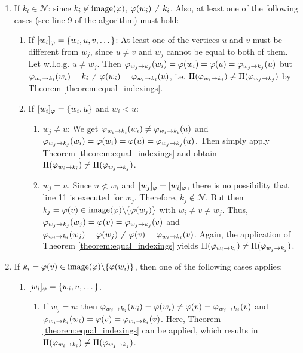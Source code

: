 \begin{\appendixproof}
\begin{enumerate}
        \begin{enumerate}
            \item If $k_i \in \mathcal{N}$: since $k_i \not\in \mathrm{image}(\varphi)$, $\varphi(w_i) \neq k_i$. Also, at least one of the following cases (see line 9 of the algorithm) must hold:
            \begin{enumerate}
                \item If $[w_i]_\varphi = \{ w_i, u, v, \dots \}$: At least one of the vertices $u$ and $v$ must be different from $w_j$, since $u \neq v$ and $w_j$ cannot be equal to both of them. Let w.l.o.g. $u \neq w_j$. Then $\varphi_{w_j\rightarrow k_j}(w_i) = \varphi(w_i) = \varphi(u) = \varphi_{w_j\rightarrow k_j}(u)$ but $\varphi_{w_i\rightarrow k_i}(w_i) = k_i \neq \varphi(w_i) = \varphi_{w_i\rightarrow k_i}(u)$, i.e. $\Pi(\varphi_{w_i\rightarrow k_i}) \neq \Pi(\varphi_{w_j\rightarrow k_j})$ by Theorem \ref{theorem:equal_indexings}.
                \item If $[w_i]_\varphi = \{w_i, u \}$ and $w_i < u$: 
                \begin{enumerate}
                    \item $w_j \neq u$: We get $\varphi_{w_i\rightarrow k_i}(w_i) \neq \varphi_{w_i\rightarrow k_i}(u)$ and $\varphi_{w_j\rightarrow k_j}(w_i) = \varphi(w_i) = \varphi(u) = \varphi_{w_j\rightarrow k_j}(u)$. Then simply apply Theorem \ref{theorem:equal_indexings} and obtain $\Pi(\varphi_{w_i\rightarrow k_i}) \neq \Pi(\varphi_{w_j\rightarrow k_j})$.
                    \item $w_j = u$. Since $u \not< w_i$ and $[w_j]_\varphi = [w_i]_\varphi$, there is no possibility that line 11 is executed for $w_j$. Therefore, $k_j \not\in \mathcal{N}$. But then $k_j= \varphi(v) \in \mathrm{image}(\varphi)\backslash \{ \varphi(w_j) \}$ with $w_i \neq v \neq w_j$. Thus, $\varphi_{w_j\rightarrow k_j}(w_j) = \varphi(v)=\varphi_{w_j\rightarrow k_j}(v)$ and $\varphi_{w_i\rightarrow k_i}(w_j) = \varphi(w_j) \neq \varphi(v) = \varphi_{w_i\rightarrow k_i}(v)$. Again, the application of Theorem \ref{theorem:equal_indexings} yields $\Pi(\varphi_{w_i\rightarrow k_i}) \neq \Pi(\varphi_{w_j\rightarrow k_j})$.
                \end{enumerate}
            \end{enumerate}
            \item If $k_i = \varphi(v) \in \mathrm{image}(\varphi)\backslash \{ \varphi(w_i) \}$, then one of the following cases applies:
            \begin{enumerate}
                \item $[w_i]_\varphi = \{w_i,u,\dots\}$. 
                \begin{enumerate}
                    \item If $w_j = u$: then $\varphi_{w_j\rightarrow k_j}(w_i) = \varphi(w_i) \neq \varphi(v) = \varphi_{w_j\rightarrow k_j}(v)$ and $\varphi_{w_i\rightarrow k_i}(w_i) = \varphi(v) = \varphi_{w_i\rightarrow k_i}(v)$. Here, Theorem \ref{theorem:equal_indexings} can be applied, which results in $\Pi(\varphi_{w_i\rightarrow k_i}) \neq \Pi(\varphi_{w_j\rightarrow k_j})$.

\end{enumerate}
\end{enumerate}
\end{enumerate}
\end{enumerate}
\end{\appendixproof}
